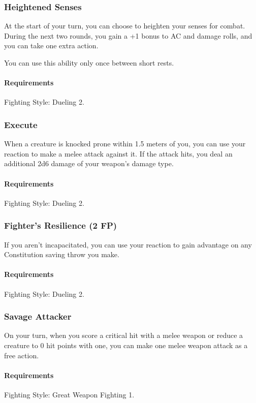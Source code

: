 \subsubsection{Heightened Senses} \label{feat::heightenedsenses}
    At the start of your turn, you can choose to heighten your senses for combat.
    During the next two rounds, you gain a +1 bonus to AC and damage rolls, and you can take one extra action.

    You can use this ability only once between short rests.
    \paragraph{Requirements} Fighting Style: Dueling 2.
\subsubsection{Execute} \label{feat::execute}
    When a creature is knocked prone within 1.5 meters of you, you can use your reaction to make a melee attack against it.
    If the attack hits, you deal an additional 2d6 damage of your weapon's damage type.
    \paragraph{Requirements} Fighting Style: Dueling 2.
\subsubsection{Fighter's Resilience (2 FP)} \label{feat::fightersresilience}
    If you aren't incapacitated, you can use your reaction to gain advantage on any Constitution saving throw you make.
    \paragraph{Requirements} Fighting Style: Dueling 2.
\subsubsection{Savage Attacker} \label{feat::savageattacker}
    On your turn, when you score a critical hit with a melee weapon or reduce a creature to 0 hit points with one, you can make one melee weapon attack as a free action.
    \paragraph{Requirements} Fighting Style: Great Weapon Fighting 1.

